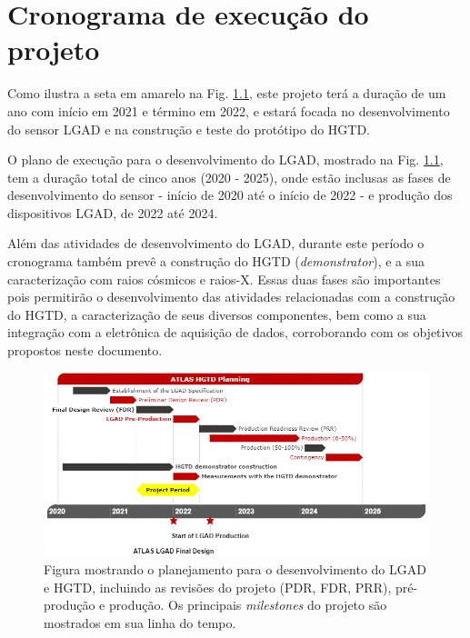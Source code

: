 \chapter{Cronograma de execução do projeto}

Como ilustra a seta em amarelo na Fig. \ref{crono}, este projeto terá a duração de um ano com início em 2021 e término em 2022, e estará focada no desenvolvimento do sensor LGAD e na construção e teste do protótipo do HGTD. 

O plano de execução para o desenvolvimento do LGAD, mostrado na Fig. \ref{crono}, tem a duração total de cinco anos (2020 - 2025), onde estão inclusas as fases de desenvolvimento do sensor - início de 2020 até o início de 2022 - e produção dos dispositivos LGAD, de 2022 até 2024. 
\thispagestyle{plain}

Além das atividades de desenvolvimento do LGAD, durante este período o cronograma também prevê a construção do HGTD (\textit{demonstrator}), e a sua caracterização com raios cósmicos e raios-X. Essas duas fases são importantes pois permitirão o desenvolvimento das atividades relacionadas com a construção do HGTD, a caracterização de seus diversos componentes, bem como a sua integração com a eletrônica de aquisição de dados, corroborando com os objetivos propostos neste documento. 

\begin{figure}[H]
    \centering 
    \includegraphics[width=16.0cm]{assets/cronogama.png}
    \caption{Figura mostrando o planejamento para o desenvolvimento do LGAD e HGTD, incluindo as revisões do projeto (PDR, FDR, PRR), pré-produção e produção. Os principais {\it milestones} do projeto são mostrados em sua linha do tempo.}
    \label{crono}
\end{figure}

\renewcommand{\cleardoublepage}{}
\renewcommand{\clearpage}{}